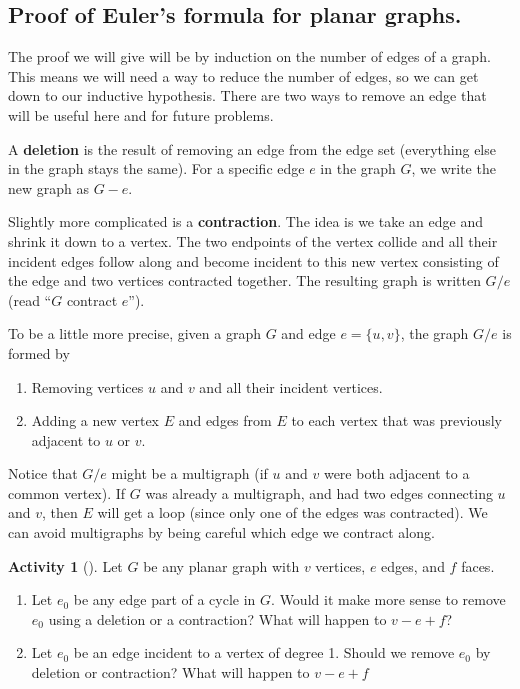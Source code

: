 \documentclass[10pt,]{book}
\newcommand{\terminology}[1]{\textbf{#1}}
\theoremstyle{plain}
\theoremstyle{definition}
\theoremstyle{definition}
\theoremstyle{definition}
\newtheorem{activity}[project]{Activity}
\numberwithin{equation}{chapter}
\begin{document}
\subsection[{Proof of Euler's formula for planar graphs.}]{Proof of Euler's formula for planar graphs.}\label{subsection-6}
\hypertarget{p-251}{}%
The proof we will give will be by induction on the number of edges of a graph.  This means we will need a way to reduce the number of edges, so we can get down to our inductive hypothesis.  There are two ways to remove an edge that will be useful here and for future problems.%
\par
\hypertarget{p-252}{}%
 A \terminology{deletion} is the result of removing an edge from the edge set (everything else in the graph stays the same).  For a specific edge \(e\) in the graph \(G\), we write the new graph as \(G - e\).%
\par
\hypertarget{p-253}{}%
 Slightly more complicated is a \terminology{contraction}.  The idea is we take an edge and shrink it down to a vertex.  The two endpoints of the vertex collide and all their incident edges follow along and become incident to this new vertex consisting of the edge and two vertices contracted together.  The resulting graph is written \(G/e\) (read ``\(G\) contract \(e\)'').%
\par
\hypertarget{p-254}{}%
To be a little more precise, given a graph \(G\) and edge \(e = \{u,v\}\), the graph \(G/e\) is formed by \leavevmode%
\begin{enumerate}
\item\hypertarget{li-27}{}\hypertarget{p-255}{}%
Removing vertices \(u\) and \(v\) and all their incident vertices.%
\item\hypertarget{li-28}{}\hypertarget{p-256}{}%
Adding a new vertex \(E\) and edges from \(E\) to each vertex that was previously adjacent to \(u\) or \(v\).%
\end{enumerate}
 Notice that \(G/e\) might be a multigraph (if \(u\) and \(v\) were both adjacent to a common vertex).  If \(G\) was already a multigraph, and had two edges connecting \(u\) and \(v\), then \(E\) will get a loop (since only one of the edges was contracted).  We can avoid multigraphs by being careful which edge we contract along.%
\begin{activity}[]\label{activity-19}
\hypertarget{p-257}{}%
Let \(G\) be any planar graph with \(v\) vertices, \(e\) edges, and \(f\) faces.%
\begin{enumerate}[font=\bfseries,label=(\alph*),ref=\alph*]
\item\label{task-31} \hypertarget{p-258}{}%
Let \(e_0\) be any edge part of a cycle in \(G\).  Would it make more sense to remove \(e_0\) using a deletion or a contraction?  What will happen to \(v - e + f\)?%
\item\label{task-32} \hypertarget{p-259}{}%
Let \(e_0\) be an edge incident to a vertex of degree 1.  Should we remove \(e_0\) by deletion or contraction?  What will happen to \(v- e + f\)%
\end{enumerate}
\end{activity}
\end{document}
